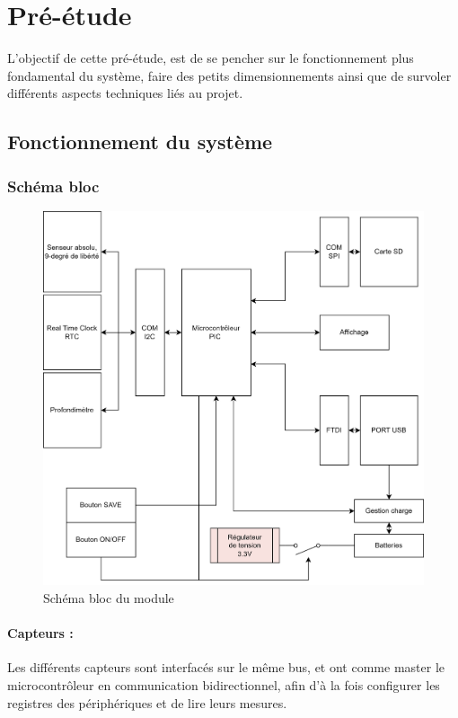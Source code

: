 \section{Pré-étude}
L'objectif de cette pré-étude, est de se pencher sur le fonctionnement plus fondamental du système, faire des petits dimensionnements ainsi que de survoler différents aspects techniques liés au projet.
\subsection{Fonctionnement du système} \label{ssec:num01}
{
\subsubsection{Schéma bloc}

\begin{figure}[h]
    \centering
    \includegraphics[width=.9\textwidth]{Figures/Schema-bloc-LocalisationSousMarin.drawio}
    \caption{Schéma bloc du module}
    \label{fig:SchemaBloc}
\end{figure}

\clearpage

\paragraph{Capteurs :} 
Les différents capteurs sont interfacés sur le même bus, et ont comme master le microcontrôleur en communication bidirectionnel, afin d'à la fois configurer les registres des périphériques et de lire leurs mesures.

}
